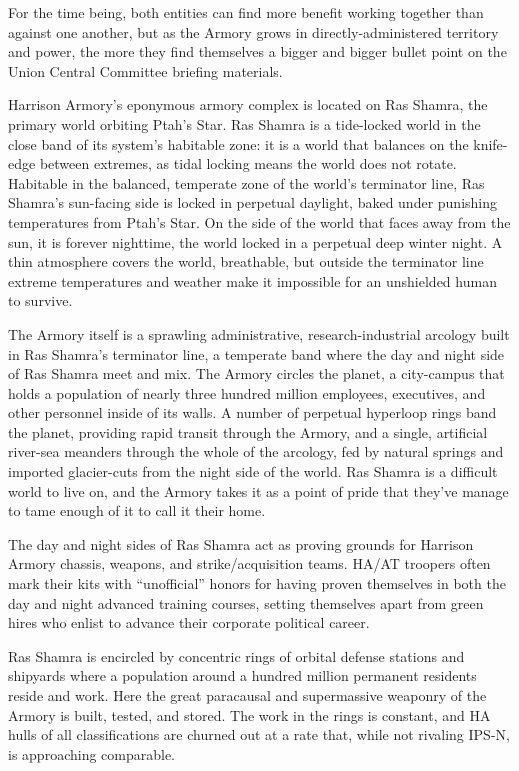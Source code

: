 For the time being, both entities can find more benefit working together than against one another,
but as the Armory grows in directly-administered territory and power, the more they find
themselves a bigger and bigger bullet point on the Union Central Committee briefing materials.

Harrison Armory’s eponymous armory complex is located on Ras Shamra, the primary world
orbiting Ptah’s Star. Ras Shamra is a tide-locked world in the close band of its system’s habitable
zone: it is a world that balances on the knife-edge between extremes, as tidal locking means the
world does not rotate. Habitable in the balanced, temperate zone of the world’s terminator line,
Ras Shamra’s sun-facing side is locked in perpetual daylight, baked under punishing
temperatures from Ptah’s Star. On the side of the world that faces away from the sun, it is forever
nighttime, the world locked in a perpetual deep winter night. A thin atmosphere covers the world,
breathable, but outside the terminator line extreme temperatures and weather make it impossible
for an unshielded human to survive.

The Armory itself is a sprawling administrative, research-industrial arcology built in Ras Shamra’s
terminator line, a temperate band where the day and night side of Ras Shamra meet and mix.
The Armory circles the planet, a city-campus that holds a population of nearly three hundred
million employees, executives, and other personnel inside of its walls. A number of perpetual
hyperloop rings band the planet, providing rapid transit through the Armory, and a single, artificial
river-sea meanders through the whole of the arcology, fed by natural springs and imported
glacier-cuts from the night side of the world. Ras Shamra is a difficult world to live on, and the
Armory takes it as a point of pride that they’ve manage to tame enough of it to call it their home.

The day and night sides of Ras Shamra act as proving grounds for Harrison Armory chassis,
weapons, and strike/acquisition teams. HA/AT troopers often mark their kits with “unofficial”
honors for having proven themselves in both the day and night advanced training courses,
setting themselves apart from green hires who enlist to advance their corporate political career.

Ras Shamra is encircled by concentric rings of orbital defense stations and shipyards where a
population around a hundred million permanent residents reside and work. Here the great
paracausal and supermassive weaponry of the Armory is built, tested, and stored. The work in
the rings is constant, and HA hulls of all classifications are churned out at a rate that, while not
rivaling IPS-N, is approaching comparable.

